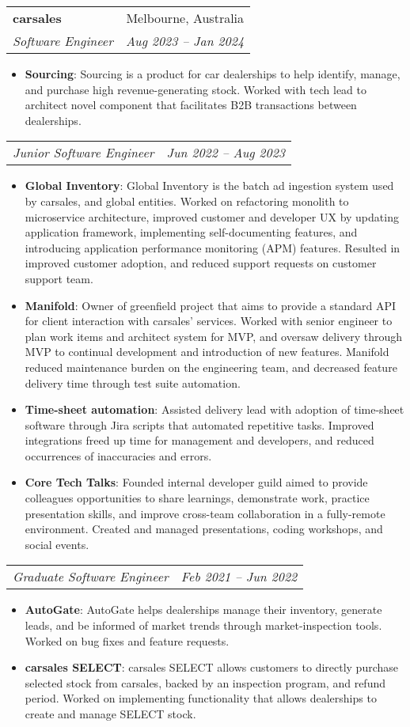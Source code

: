 \documentclass[letterpaper,11pt]{article}
\makeatletter
\newcommand{\resumeItem}[2]{
  \item\small{
    \textbf{#1}{: #2 \vspace{-2pt}}
  }
}
\newcommand{\resumeSubheading}[4]{
  \vspace{-1pt}\item
    \begin{tabular*}{0.97\textwidth}[t]{l@{\extracolsep{\fill}}r}
      \textbf{#1} & #2 \\
      \textit{\small#3} & \textit{\small #4} \\
    \end{tabular*}\vspace{-5pt}
}
\newcommand{\resumeSubSubheading}[2]{
    \begin{tabular*}{0.97\textwidth}{l@{\extracolsep{\fill}}r}
      \textit{\small#1} & \textit{\small #2} \\
    \end{tabular*}\vspace{-5pt}
}
\newcommand{\resumeItemListStart}{\begin{itemize}}
\newcommand{\resumeItemListEnd}{\end{itemize}\vspace{-5pt}}
\makeatother
\begin{document}
    \resumeSubheading
      {carsales}{Melbourne, Australia}
      {Software Engineer}{Aug 2023 -- Jan 2024}
      \resumeItemListStart
        \resumeItem{Sourcing}
          {Sourcing is a product for car dealerships to help identify, manage, and purchase high revenue-generating stock. Worked with tech lead to architect novel component that facilitates B2B transactions between dealerships.}
      \resumeItemListEnd
      
      \resumeSubSubheading
        {Junior Software Engineer}{Jun 2022 -- Aug 2023}
        \resumeItemListStart
          \resumeItem{Global Inventory}
            {Global Inventory is the batch ad ingestion system used by carsales, and global entities. Worked on refactoring monolith to microservice architecture, improved customer and developer UX by updating application framework, implementing self-documenting features, and introducing application performance monitoring (APM) features. Resulted in improved customer adoption, and reduced support requests on customer support team.}
          \resumeItem{Manifold}
            {Owner of greenfield project that aims to provide a standard API for client interaction with carsales’ services. Worked with senior engineer to plan work items and architect system for MVP, and oversaw delivery through MVP to continual development and introduction of new features. Manifold reduced maintenance burden on the engineering team, and decreased feature delivery time through test suite automation.}
          \resumeItem{Time-sheet automation}
            {Assisted delivery lead with adoption of time-sheet software through Jira scripts that automated repetitive tasks. Improved integrations freed up time for management and developers, and reduced occurrences of inaccuracies and errors.}
          \resumeItem{Core Tech Talks}
            {Founded internal developer guild aimed to provide colleagues opportunities to share learnings, demonstrate work, practice presentation skills, and improve cross-team collaboration in a fully-remote environment. Created and managed presentations, coding workshops, and social events.}
        \resumeItemListEnd

      \resumeSubSubheading
        {Graduate Software Engineer}{Feb 2021 -- Jun 2022}
        \resumeItemListStart
          \resumeItem{AutoGate}
            {AutoGate helps dealerships manage their inventory, generate leads, and be informed of market trends through market-inspection tools. Worked on bug fixes and feature requests.}
          \resumeItem{carsales SELECT}
            {carsales SELECT allows customers to directly purchase selected stock from carsales, backed by an inspection program, and refund period. Worked on implementing functionality that allows dealerships to create and manage SELECT stock.}
        \resumeItemListEnd
\end{document}
